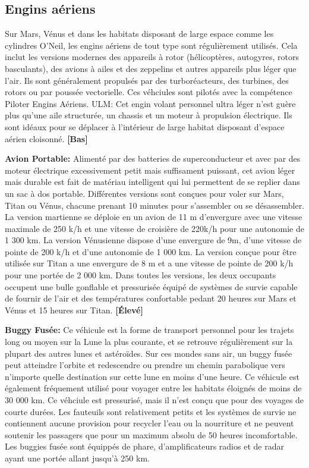 \subsection{Engins aériens} \label{sec:aircraft} 

Sur Mars, Vénus et dans les habitats disposant de large espace comme les cylindres O'Neil, les engins aériens de tout type sont régulièrement utilisés. Cela inclut les versions modernes des appareils à rotor (hélicoptères, autogyres, rotors basculants), des avions à ailes et des zeppelins et autres appareils plus léger que l'air. Ils sont généralement propulsés par des turboréacteurs, des turbines, des rotors ou par poussée vectorielle. Ces véhciules sont pilotés avec la compétence Piloter Engins Aériens. ULM: Cet engin volant personnel ultra léger n'est guère plus qu'une aile structurée, un chassis et un moteur à propulsion électrique. Ils sont idéaux pour se déplacer à l'intérieur de large habitat disposant d'espace aérien cloisonné. \textbf{[Bas]} 

\textbf{Avion Portable:} Alimenté par des batteries de superconducteur et avec par des moteur électrique excessivement petit mais suffisament puissant, cet avion léger mais durable est fait de matériau intelligent qui lui permettent de se replier dans un sac à dos portable. Différentes versions sont conçues pour voler sur Mars, Titan ou Vénus, chacune prenant 10 minutes pour s'assembler ou se désassembler. La version martienne se déploie en un avion de 11 m d'envergure avec une vitesse maximale de 250 k/h et une vitesse de croisière de 220k/h pour une autonomie de 1 300 km. La version Vénusienne dispose d'une envergure de 9m, d'une vitesse de pointe de 200 k/h et d'une autonomie de 1 000 km. La version conçue pour être utilisée sur Titan a une envergure de 8 m et a une vitesse de pointe de 200 k/h pour une portée de 2 000 km. Dans toutes les versions, les deux occupants occupent une bulle gonflable et pressurisée équipé de systèmes de survie capable de fournir de l'air et des températures confortable pedant 20 heures sur Mars et Vénus et 15 heures sur Titan. \textbf{[Élevé]} 

\textbf{Buggy Fusée:} Ce véhicule est la forme de transport personnel pour les trajets long ou moyen sur la Lune la plus courante, et se retrouve régulièrement sur la plupart des autres lunes et astéroïdes. Sur ces mondes sans air, un buggy fusée peut atteindre l'orbite et redescendre ou prendre un chemin parabolique vers n'importe quelle destination sur cette lune en moins d'une heure. Ce véhicule est également fréquement utilisé pour voyager entre les habitats éloignés de moins de 30 000 km. Ce véhciule est pressurisé, mais il n'est conçu que pour des voyages de courte durées. Les fauteuils sont relativement petits et les systèmes de survie ne contiennent aucune provision pour recycler l'eau ou la nourriture et ne peuvent soutenir les passagers que pour un maximum absolu de 50 heures incomfortable. Les buggies fusée sont équippés de phare, d'amplificateurs radios et de radar ayant une portée allant jusqu'à 250 km. 

